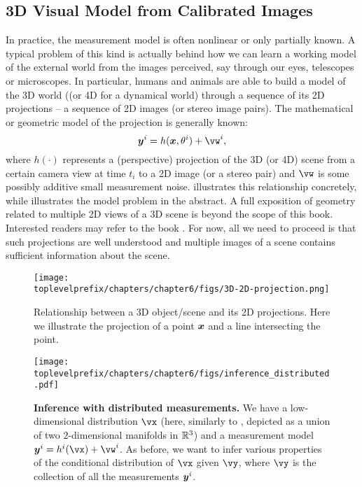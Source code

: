 \documentclass[../../book-main.tex]{subfiles}
\begin{document}
\subsection{3D Visual Model from Calibrated Images}
In practice, the measurement model is often nonlinear or only partially known. A typical problem of this kind is actually behind how we can learn a working model of the external world from the  images perceived, say through our eyes,  telescopes or microscopes. In particular, humans and animals are able to build a model of the 3D world ((or 4D for a dynamical world) through a sequence of its 2D projections -- a sequence of 2D images (or stereo image pairs). The mathematical or geometric model of the projection is generally known:
\begin{equation}
    \y^i = h(\x, \theta^i) +\vw^{i}, 
\end{equation}
where $h(\cdot)$ represents a  (perspective) projection of the 3D (or 4D) scene from a certain camera view at time $t_i$ to a 2D image (or a stereo pair) and $\vw$ is some possibly additive small measurement noise.  illustrates this relationship concretely, while  illustrates the model problem in the abstract. A full exposition of geometry related to multiple 2D views of a 3D scene is beyond the scope of this book. Interested readers may refer to the book \cite{MaY2003}. For now, all we need to proceed is that such projections are well understood and multiple images of a scene contains sufficient information about the scene.
\begin{figure}[t]
    \centering
    \texttt{[image: \\toplevelprefix/chapters/chapter6/figs/3D-2D-projection.png]}
    \caption{Relationship between a 3D object/scene and its 2D projections. Here we illustrate the projection of a point $\bm{x}$ and a line intersecting the point.}
    \label{fig:projection-2D}
\end{figure}

\begin{figure}[t]
  \centering 
  \texttt{[image: \\toplevelprefix/chapters/chapter6/figs/inference\_distributed.pdf]}
  \caption{\small \textbf{Inference with distributed measurements.} We have a low-dimensional distribution \(\vx\) (here, similarly to , depicted as a union of two \(2\)-dimensional manifolds in \(\mathbb{R}^{3}\)) and a measurement model \(\y^{i} = h^{i}(\vx) + \vw^{i}\). As before, we want to infer various properties of the conditional distribution of \(\vx\) given \(\vy\), where \(\vy\) is the collection of all the measurements \(\bm{y}^{i}\).}
  \label{fig:inference_distributed}
\end{figure}
\end{document}
